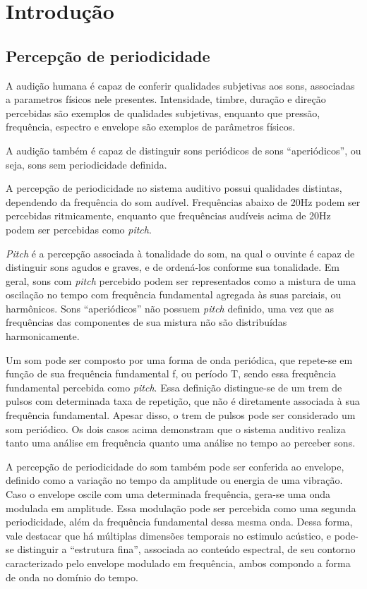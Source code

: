 \chapter{Introdução}
\section{Percepção de periodicidade}
A audição humana é capaz de conferir qualidades subjetivas aos sons, associadas
a parametros físicos nele presentes. Intensidade, timbre, duração e direção percebidas
são exemplos de qualidades subjetivas, enquanto que pressão, frequência,
espectro e envelope são exemplos de parâmetros físicos.\cite{rossing2002}

A audição também é capaz de distinguir sons periódicos de sons ``aperiódicos'', ou seja,
 sons sem periodicidade definida.

A percepção de periodicidade no sistema auditivo possui qualidades distintas,
 dependendo da frequência do som audível. Frequências abaixo de
20Hz podem ser percebidas ritmicamente, enquanto que frequências audíveis acima de
 20Hz podem ser percebidas como \textit{pitch}.

\textit{Pitch} é a percepção associada à tonalidade do som, na qual o ouvinte é capaz
de distinguir sons agudos e graves, e de ordená-los conforme sua tonalidade.
 Em geral, sons com \textit{pitch} percebido podem ser representados como a mistura de uma
oscilação no tempo com frequência fundamental agregada às suas parciais, ou
 harmônicos. Sons ``aperiódicos'' não possuem \textit{pitch} definido, uma vez que as frequências das
 componentes de sua mistura não são distribuídas harmonicamente. \cite{langner1992} \cite{angus2009} 

 Um som pode ser composto por uma forma de onda periódica, que
 repete-se em função de sua frequência fundamental f, ou período T, sendo essa 
 frequência fundamental percebida como \textit{pitch}. Essa definição distingue-se de um
 trem de pulsos com determinada taxa de repetição, que não é diretamente
 associada à sua frequência fundamental. Apesar disso, o trem de pulsos pode ser
considerado um som periódico. Os dois casos acima demonstram que o sistema
auditivo realiza tanto uma análise em frequência quanto uma análise no tempo
ao perceber sons. \cite{rossing2002}  


A percepção de periodicidade do som também pode ser conferida ao envelope,
definido como a variação no tempo da amplitude ou energia de uma vibração.
Caso o envelope oscile com uma determinada frequência, gera-se uma onda
modulada em amplitude.
Essa modulação pode ser percebida como uma segunda periodicidade,
além da frequência fundamental dessa mesma onda. Dessa forma, vale destacar
que há múltiplas dimensões temporais no estimulo acústico, e pode-se distinguir
a ``estrutura fina'', associada ao conteúdo espectral, de seu contorno caracterizado
pelo envelope modulado em frequência, ambos compondo a forma de onda no
domínio do tempo. \cite{joris2004}

